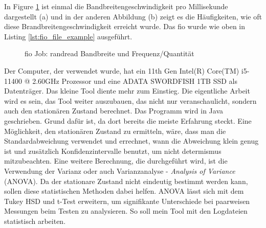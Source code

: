 \documentclass{article}
\begin{document}
\bigskip
In Figure \ref{fig:log_graphs}  ist einmal die Bandbreitengeschwindigkeit pro Millisekunde dargestellt (a) und in der anderen Abbildung (b) zeigt es die Häufigkeiten, 
wie oft diese Brandbreitengeschwindigkeit erreicht wurde. Das fio wurde wie oben in Listing \ref{lst:fio_file_example} ausgeführt.

\begin{figure}%
    \centering
    \qquad
    \caption{fio Job: randread Bandbreite und Frequenz/Quantität}%
    \label{fig:log_graphs}%
\end{figure}


Der Computer, der verwendet wurde, hat ein 11th Gen Intel(R) Core(TM) i5-11400 @ 2.60GHz Prozessor und eine ADATA SWORDFISH 1TB SSD  als Datenträger.
Das kleine Tool diente mehr zum Einstieg. Die eigentliche Arbeit wird es sein, das Tool weiter auszubauen, das nicht nur veranschaulicht,
sondern auch den stationären Zustand berechnet.
Das Programm wird in Java geschrieben. Grund dafür ist, da dort bereits die meiste Erfahrung steckt.
Eine Möglichkeit, den stationären Zustand zu ermitteln, wäre, dass man die Standardabweichung verwendet und errechnet, wann die Abweichung klein genug ist und zusätzlich Konfidenzintervalle benutzt, um nicht determismus mitzubeachten.
Eine weitere Berechnung, die durchgeführt wird, ist die Verwendung der Varianz oder auch Varianzanalyse - \textit{Analysis of Variance} (ANOVA).
Da der stationare Zustand nicht eindeutig bestimmt werden kann, sollen diese statistischen Methoden dabei helfen.
ANOVA lässt sich mit dem Tukey HSD und t-Test erweitern, um signifikante Unterschiede bei paarweisen Messungen beim Testen zu analysieren. So soll mein Tool mit den Logdateien statistisch arbeiten.
\end{document}
